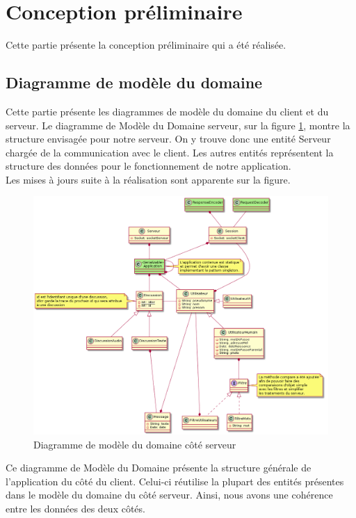 \section{Conception préliminaire}

Cette partie présente la conception préliminaire qui a été réalisée.

	\subsection{Diagramme de modèle du domaine}
	Cette partie présente les diagrammes de modèle du domaine du client et du serveur.
	Le diagramme de Modèle du Domaine serveur, sur la figure \ref{diagModeleServeur}, montre la structure envisagée pour notre serveur.
	On y trouve donc une entité Serveur chargée de la communication avec le client.
	Les autres entités représentent la structure des données pour le fonctionnement de notre application.\\

	Les mises à jours suite à la réalisation sont apparente sur la figure.

	\begin{figure}[H]
	\centerline{\includegraphics[width=16.5cm]{img/modeleDomaineServeurV2.png}}
	\caption{\label{diagModeleServeur}Diagramme de modèle du domaine côté serveur}
	\end{figure}

	\newpage

	Ce diagramme de Modèle du Domaine présente la structure générale de l'application du côté du client.
	Celui-ci réutilise la plupart des entités présentes dans le modèle du domaine du côté serveur.
	Ainsi, nous avons une cohérence entre les données des deux côtés. \\

